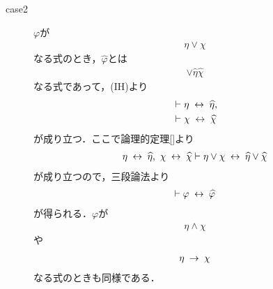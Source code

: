 \begin{sketch}
\begin{description}
\begin{description}
				\item[case2] 
					$\varphi$が
					\begin{align}
						\eta \vee \chi
					\end{align}
					なる式のとき，$\widehat{\varphi}$とは
					\begin{align}
						\vee \widehat{\eta} \widehat{\chi}
					\end{align}
					なる式であって，(IH)より
					\begin{align}
						&\vdash \eta \hspace{0.25em}\leftrightarrow\hspace{0.25em} \widehat{\eta}, \\
						&\vdash \chi \hspace{0.25em}\leftrightarrow\hspace{0.25em} \widehat{\chi}
					\end{align}
					が成り立つ．ここで論理的定理\ref{}より
					\begin{align}
						\eta \hspace{0.25em}\leftrightarrow\hspace{0.25em} \widehat{\eta},\ \chi \hspace{0.25em}\leftrightarrow\hspace{0.25em} \widehat{\chi} \vdash 
						\eta \vee \chi \hspace{0.25em}\leftrightarrow\hspace{0.25em} \widehat{\eta} \vee \widehat{\chi}
					\end{align}
					が成り立つので，三段論法より
					\begin{align}
						\vdash \varphi \hspace{0.25em}\leftrightarrow\hspace{0.25em} \widehat{\varphi}
					\end{align}
					が得られる．$\varphi$が
					\begin{align}
						\eta \wedge \chi
					\end{align}
					や
					\begin{align}
						\eta \hspace{0.25em}\rightarrow\hspace{0.25em} \chi
					\end{align}
					なる式のときも同様である．
					

\end{description}
\end{description}
\end{sketch}
